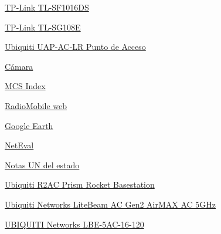 \documentclass{article}
\begin{document}
\quad

\href{https://www.amazon.es/TP-Link-TL-SF1016DS-escritorio-puertos-100Mbps/dp/B0054TXRVQ/}{TP-Link TL-SF1016DS}

\quad

\href{https://www.amazon.es/TP-Link-TL-SG108E-configuraci%C3%B3n-administrada-priorizaci%C3%B3n/dp/B00JKB63D8}{TP-Link TL-SG108E}

\quad

\href{https://www.amazon.es/Ubiquiti-UAP-AC-LR-Punto-Acceso-inal%C3%A1mbrico/dp/B016K5A06C?th=1}{Ubiquiti UAP-AC-LR Punto de Acceso}

\quad

\href{https://www.amazon.es/dp/B09K7HVKLT/ref=tsm_1_fb_lk}{Cámara}

\quad

\href{https://mcsindex.com/}{MCS Index}

\quad

\href{https://www.ve2dbe.com/english1.html}{RadioMobile web}

\quad


\href{https://earth.google.com/web/}{Google Earth}

\quad

\href{http://labit501.upct.es:8080/}{NetEval}

\quad

\href{https://avancedigital.mineco.gob.es/espectro/CNAF/notas-UN-2017.pdf}{Notas UN del estado}

\quad

\href{https://maker-store.es/home-office/wireless-lan/wireless-lan-antennen/3748/ubiquiti-r2ac-prism-rocket-basestation}{Ubiquiti R2AC Prism Rocket Basestation}

\quad

\href{https://www.pccomponentes.com/ubiquiti-networks-litebeam-ac-gen2-airmax-ac-5ghz?srsltid=AfmBOorsXOMoawlF2P6S67Bx6O224uWPzhzismqEu5VPiAxKXXhdxbW32vw}{Ubiquiti Networks LiteBeam AC Gen2 AirMAX AC 5GHz}

\quad

\href{https://www.amazon.es/UBIQUITI-Networks-LBE-5AC-16-120-Repetidor-5-15-5-875/dp/B019M0KK44}{UBIQUITI Networks LBE-5AC-16-120}
\end{document}
